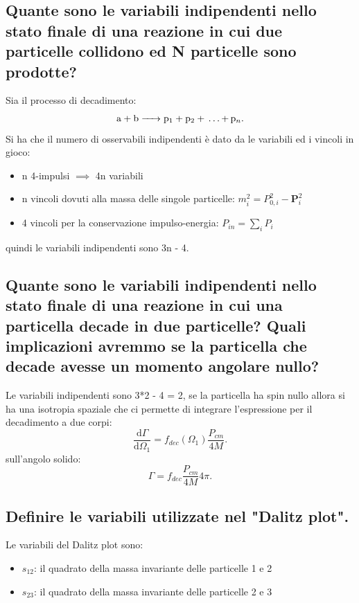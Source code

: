 \subsection[]{ Quante sono le variabili indipendenti nello stato finale di una reazione in cui due particelle collidono ed N particelle sono prodotte?}
Sia il processo di decadimento:
\[
	\ce{a + b -> p_1 + p_2 + \ldots \text{+} p_n }
.\] 
Si ha che il numero di osservabili indipendenti è dato da le variabili ed i vincoli in gioco:
\begin{itemize}
	\item n 4-impulsi $\implies$ 4n variabili
	\item n vincoli dovuti alla massa delle singole particelle: $m_i^2 = P_{0, i}^2 - \boldsymbol{P}_{i}^2$
	\item 4 vincoli per la conservazione impulso-energia: $P_{in} = \sum_i P_i$
\end{itemize}
quindi le variabili indipendenti sono 3n - 4.

\subsection[]{ Quante sono le variabili indipendenti nello stato finale di una reazione in cui una particella decade in due particelle? Quali implicazioni avremmo se la particella che decade avesse un momento angolare nullo? }
Le variabili indipendenti sono 3*2 - 4 = 2, se la particella ha spin nullo allora si ha una isotropia spaziale che ci permette di integrare l'espressione per il decadimento a due corpi:
\[
	\frac{\mbox{d} \Gamma}{\mbox{d} \Omega_1} = f_{dec}\left( \Omega_1 \right) \frac{P_{cm}}{4M} 
.\] 
sull'angolo solido:
\[
	\Gamma = f_{dec} \frac{P_{cm}}{4M}4\pi
.\] 

\subsection[]{ Definire le variabili utilizzate nel "Dalitz plot".}
Le variabili del Dalitz plot sono:
\begin{itemize}
	\item $s_{12}$: il quadrato della massa invariante delle particelle 1 e 2
	\item $s_{23}$: il quadrato della massa invariante delle particelle 2 e 3
\end{itemize}

